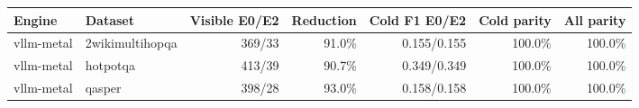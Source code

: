 \begin{tabular}{llrrrrr}
\toprule
Engine & Dataset & Visible E0/E2 & Reduction & Cold F1 E0/E2 & Cold parity & All parity \\
\midrule
vllm-metal & 2wikimultihopqa & 369/33 & 91.0\% & 0.155/0.155 & 100.0\% & 100.0\% \\
vllm-metal & hotpotqa & 413/39 & 90.7\% & 0.349/0.349 & 100.0\% & 100.0\% \\
vllm-metal & qasper & 398/28 & 93.0\% & 0.158/0.158 & 100.0\% & 100.0\% \\
\bottomrule
\end{tabular}

